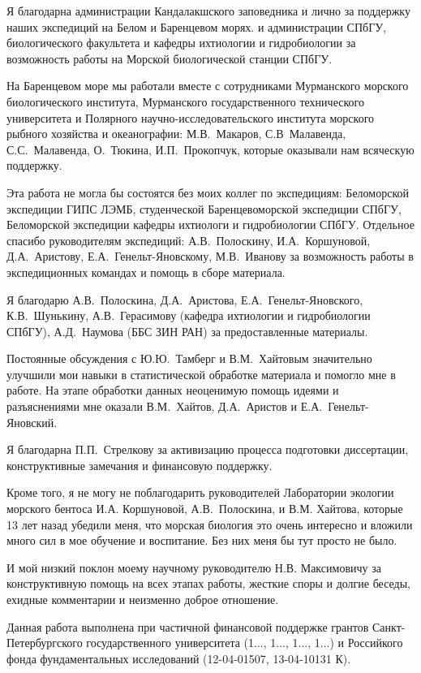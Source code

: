 Я благодарна администрации Кандалакшского заповедника и лично  за поддержку наших экспедиций на Белом и Баренцевом морях.
и администрации СПбГУ, биологического факультета и кафедры ихтиологии и гидробиологии за возможность работы на Морской биологической станции СПбГУ.

На Баренцевом море мы работали вместе с сотрудниками Мурманского морского биологического института, Мурманского государственного технического университета и Полярного научно-исследовательского института морского рыбного хозяйства и океанографии: М.\:В.~Макаров, С.\:В~Малавенда, С.\:С.~Малавенда, О.~Тюкина, И.\:П.~Прокопчук, которые оказывали нам всяческую поддержку.  

Эта работа не могла бы состоятся без моих коллег по экспедициям: Беломорской экспедиции ГИПС ЛЭМБ, студенческой Баренцевоморской экспедиции СПбГУ, Беломорской экспедиции кафедры ихтиологи и гидробиологии СПбГУ. 
Отдельное спасибо руководителям экспедиций: А.\:В.~Полоскину, И.\:А.~Коршуновой, Д.\:А.~Аристову, Е.\:А.~Генельт-Яновскому, М.В.~Иванову за возможность работы в экспедиционных командах и помощь в сборе материала.

Я благодарю А.\:В.~Полоскина, Д.\:А.~Аристова, Е.\:А.~Генельт-Яновского, К.\:В.~Шунькину, А.\:В.~Герасимову (кафедра ихтиологии и гидробиологии СПбГУ), А.\:Д.~Наумова (ББС ЗИН РАН) за предоставленные материалы.

Постоянные обсуждения с Ю.\:Ю.~Тамберг и В.\:М.~Хайтовым значительно улучшили мои навыки в статистической обработке материала и помогло мне в работе.
На этапе обработки данных неоценимую помощь идеями и разъяснениями мне оказали В.\:М.~Хайтов, Д.\:А.~Аристов и Е.\:А.~Генельт-Яновский.

Я благодарна П.\:П.~Стрелкову за активизацию процесса подготовки диссертации, конструктивные замечания и финансовую поддержку.

Кроме того, я не могу не поблагодарить руководителей Лаборатории экологии морского бентоса И.\:А. Коршуновой, А.\:В.~Полоскина,  и В.\:М. Хайтова, которые 13 лет назад убедили меня, что морская биология это очень интересно и вложили много сил в мое обучение и воспитание. 
Без них меня бы тут просто не было.

И мой низкий поклон моему научному руководителю Н.\:В. Максимовичу за конструктивную помощь на всех этапах работы, жесткие споры и долгие беседы, ехидные комментарии и неизменно доброе отношение.

\vspace{3ex}

Данная работа выполнена при частичной финансовой поддержке грантов Санкт-Петер\-бург\-ского государственного университета (1..., 1..., 1..., 1...) и Российкого фонда фундаментальных исследований (12-04-01507, 13-04-10131 К). 

